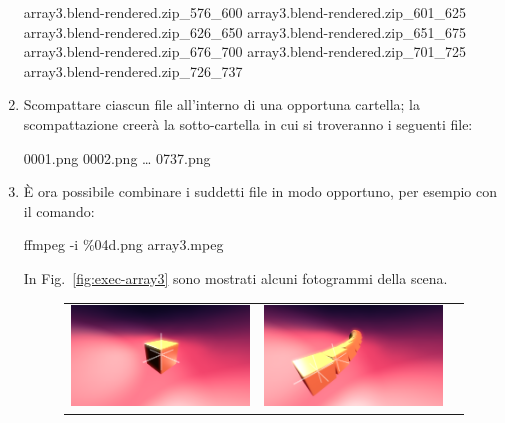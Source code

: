 \begin{enumerate}
\begin{mgCodeBox}
array3.blend-rendered.zip\_576\_600\newline
array3.blend-rendered.zip\_601\_625\newline
array3.blend-rendered.zip\_626\_650\newline
array3.blend-rendered.zip\_651\_675\newline
array3.blend-rendered.zip\_676\_700\newline
array3.blend-rendered.zip\_701\_725\newline
array3.blend-rendered.zip\_726\_737
\end{mgCodeBox}
\item \label{lbl:exec-array3-postrenderstep3} Scompattare ciascun file all'interno di una opportuna cartella; la scompattazione creer\`a la sotto-cartella  in cui si troveranno i seguenti file:
\begin{mgCodeBox}
\small
0001.png\newline
0002.png\newline
\dots\newline
0737.png
\end{mgCodeBox}
\item \label{lbl:exec-array3-postrenderstep4} \`E ora possibile combinare i suddetti file in modo opportuno, per esempio con il comando:
\begin{mgCodeBox}
\small
ffmpeg -i \%04d.png array3.mpeg
\end{mgCodeBox}
In Fig.~\ref{fig:exec-array3} sono mostrati alcuni fotogrammi della scena.
\begin{figure}
\centering
\begin{tabular}{ccc}
\includegraphics[scale=0.17]{images/array3-1} &
\includegraphics[scale=0.17]{images/array3-2} &

\end{tabular}
\end{figure}
\end{enumerate}
